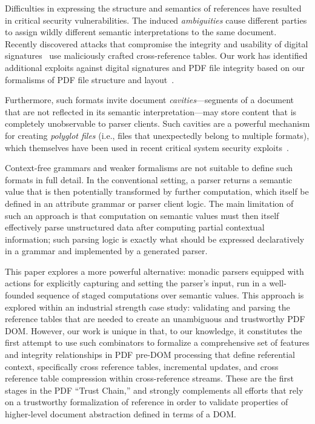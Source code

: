 Difficulties in expressing the structure and semantics of references
have resulted in critical security vulnerabilities.
%
The induced \emph{ambiguities} cause different parties
to assign wildly different semantic interpretations to the same
document.
%
Recently discovered attacks that compromise the integrity and
usability of digital
signatures~\cite{rohlmannBreakingSpecificationPDF2021,
  mainkaShadowAttacksHiding2021} use maliciously crafted
cross-reference tables. Our work has identified additional exploits
against digital signatures and PDF file integrity based on our
formalisms of PDF file structure and layout~\cite{cve-2022-25641}.

Furthermore, such formats invite document \emph{cavities}---segments
of a document that are not reflected in its semantic
interpretation---may store content that is completely unobservable to
parser clients.
%
Such cavities are a powerful mechanism for creating \emph{polyglot
  files} (i.e., files that unexpectedly belong to multiple formats),
which themselves have been used in recent critical system security
exploits~\cite{psychicPaper}.

Context-free grammars and weaker formalisms are not suitable to define 
such formats in full detail.
%
In the conventional setting, a parser returns a semantic value that is
then potentially transformed by further computation, which itself be
defined in an attribute grammar or parser client logic.
%
The main limitation of such an approach is that computation on
semantic values must then itself effectively parse unstructured data
after computing partial contextual information;
%
such parsing logic is exactly what should be expressed declaratively
in a grammar and implemented by a generated parser.

This paper explores a more powerful alternative: monadic parsers equipped 
with actions for explicitly capturing and setting the parser's input, run 
in a well-founded sequence of staged computations over semantic values.
%
This approach is explored within an industrial strength case study:
validating and parsing the reference tables that are needed to create 
an unambiguous and trustworthy PDF DOM.
%
However, our work is unique in that, to our knowledge, it constitutes
the first attempt to use such combinators to formalize a comprehensive
set of features and integrity relationships in PDF pre-DOM processing
that define referential context, specifically cross reference tables,
incremental updates, and cross reference table compression within
cross-reference streams.
These are the first stages in the PDF ``Trust Chain,'' and  strongly complements all
efforts that rely on a trustworthy formalization of reference in order
to validate properties of higher-level document abstraction defined in
terms of a DOM.

